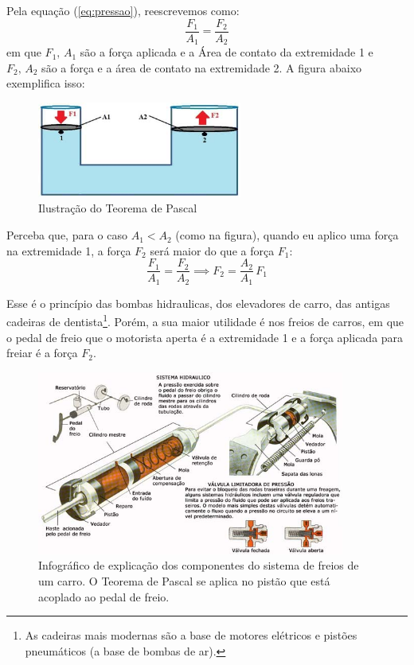 \documentclass[12pt]{extarticle}
\newcommand{\<}{\langle}
\renewcommand{\>}{\rangle}
\theoremstyle{definition}
\begin{document}
Pela equação (\ref{eq:pressao}), reescrevemos como:
\begin{equation}
    \frac{F_1}{A_1} = \frac{F_2}{A_2}
\end{equation}
\noindent em que $F_1,\,A_1$ são a força aplicada e a Área de contato da extremidade 1 e $F_2,\,A_2$ são a força e a área de contato na extremidade 2. A figura abaixo exemplifica isso:
\begin{figure}[H]
    \centering
    \includegraphics[width=0.6\textwidth]{mbolos.jpg}
    \caption{Ilustração do Teorema de Pascal}
    \label{fig:pascal}
\end{figure}

Perceba que, para o caso $A_1 < A_2$ (como na figura), quando eu aplico uma força na extremidade 1, a força $F_2$ será maior do que a força $F_1$:
\begin{equation}
    \frac{F_1}{A_1} = \frac{F_2}{A_2} \implies F_2 = \frac{A_2}{A_1}\,F_1
\end{equation}

Esse é o princípio das bombas hidraulicas, dos elevadores de carro, das antigas cadeiras de dentista\footnote{As cadeiras mais modernas são a base de motores elétricos e pistões pneumáticos (a base de bombas de ar).}. Porém, a sua maior utilidade é nos freios de carros, em que o pedal de freio que o motorista aperta é a extremidade 1 e a força aplicada para freiar é a força $F_2$.

\begin{figure}[H]
    \centering
    \includegraphics[width=0.9\textwidth]{Válvula-limitadora-de-pressão.jpg}
    \caption{Infográfico de explicação dos componentes do sistema de freios de um carro. O Teorema de Pascal se aplica no pistão que está acoplado ao pedal de freio.}
    \label{fig:freio}
\end{figure}
\end{document}
